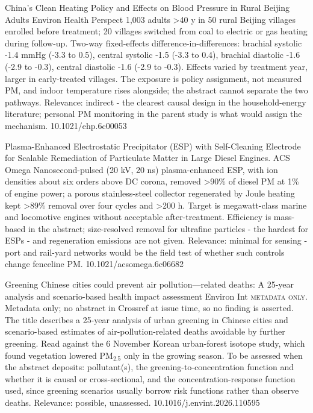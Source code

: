 \documentclass[10pt]{article}
\begin{document}
{China’s Clean Heating Policy and Effects on Blood Pressure in Rural Beijing Adults}
{Environ Health Perspect}
{1,003 adults >40 y in 50 rural Beijing villages enrolled before treatment; 20 villages switched from coal to electric or gas heating during follow-up. Two-way fixed-effects difference-in-differences: brachial systolic -1.4 mmHg (-3.3 to 0.5), central systolic -1.5 (-3.3 to 0.4), brachial diastolic -1.6 (-2.9 to -0.3), central diastolic -1.6 (-2.9 to -0.3). Effects varied by treatment year, larger in early-treated villages. The exposure is policy assignment, not measured PM, and indoor temperature rises alongside; the abstract cannot separate the two pathways. Relevance: indirect - the clearest causal design in the household-energy literature; personal PM monitoring in the parent study is what would assign the mechanism.}
{10.1021/ehp.6c00053}

{Plasma-Enhanced Electrostatic Precipitator (ESP) with Self-Cleaning Electrode for Scalable Remediation of Particulate Matter in Large Diesel Engines.}
{ACS Omega}
{Nanosecond-pulsed (20 kV, 20 ns) plasma-enhanced ESP, with ion densities about six orders above DC corona, removed >90\% of diesel PM at 1\% of engine power; a porous stainless-steel collector regenerated by Joule heating kept >89\% removal over four cycles and >200 h. Target is megawatt-class marine and locomotive engines without acceptable after-treatment. Efficiency is mass-based in the abstract; size-resolved removal for ultrafine particles - the hardest for ESPs - and regeneration emissions are not given. Relevance: minimal for sensing - port and rail-yard networks would be the field test of whether such controls change fenceline PM.}
{10.1021/acsomega.6c06682}

{Greening Chinese cities could prevent air pollution—related deaths: A 25-year analysis and scenario-based health impact assessment}
{Environ Int}
{\textsc{metadata only.} Metadata only; no abstract in Crossref at issue time, so no finding is asserted. The title describes a 25-year analysis of urban greening in Chinese cities and scenario-based estimates of air-pollution-related deaths avoidable by further greening. Read against the 6 November Korean urban-forest isotope study, which found vegetation lowered PM$_{2.5}$ only in the growing season. To be assessed when the abstract deposits: pollutant(s), the greening-to-concentration function and whether it is causal or cross-sectional, and the concentration-response function used, since greening scenarios usually borrow risk functions rather than observe deaths. Relevance: possible, unassessed.}
{10.1016/j.envint.2026.110595}
\end{document}
